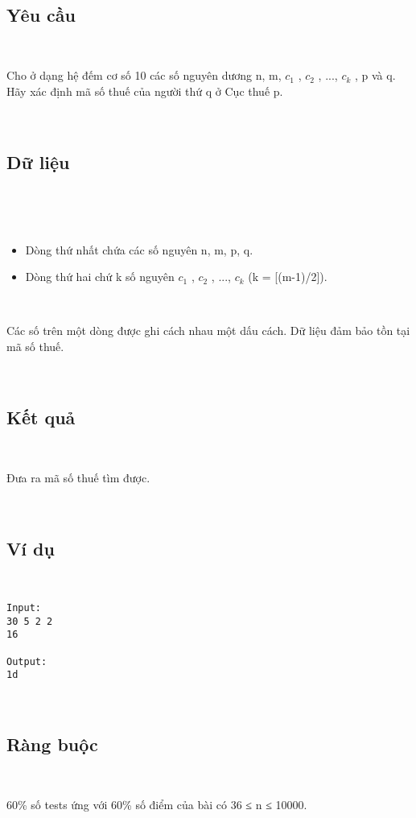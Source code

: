  

\subsection{\textbf{Yêu cầu }}

 

Cho ở dạng hệ đếm cơ số 10 các số nguyên dương n, m, $c_{1}$ , $c_{2}$ , ..., $c_{k}$ , p và q. Hãy xác định mã số thuế của người thứ q ở Cục thuế p.

 

\subsection{\textbf{Dữ liệu }}

 

 
\begin{itemize}
	\item Dòng thứ nhất chứa các số nguyên n, m, p, q.
	\item Dòng thứ hai chứ k số nguyên $c_{1}$ , $c_{2}$ , ..., $c_{k}$ (k = [(m-1)/2]).
\end{itemize}

 

Các số trên một dòng được ghi cách nhau một dấu cách. Dữ liệu đảm bảo tồn tại mã số thuế.

 

\subsection{\textbf{Kết quả }}

 

Đưa ra mã số thuế tìm được.

 

\subsection{\textbf{Ví dụ }}

 
\begin{verbatim}
Input:
30 5 2 2
16

Output:
1d
\end{verbatim}

 

\subsection{\textbf{Ràng buộc }}

 

60\% số tests ứng với 60\% số điểm của bài có 36 ≤ n ≤ 10000.
